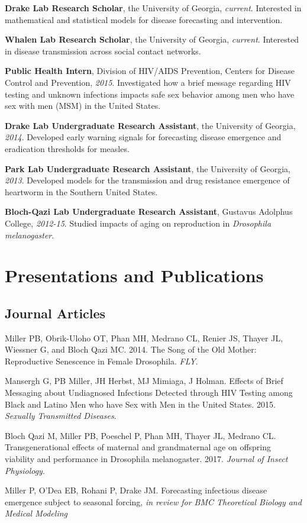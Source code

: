 \documentclass[letterpaper]{article}
\renewenvironment{itemize}{
  \begin{list}{}{
    \setlength{\leftmargin}{1.5em}
  }
}{
  \end{list}
}
\begin{document}
\begin{itemize}
\item \textbf{Drake Lab Research Scholar}, the University of Georgia, \textit{current}. Interested in mathematical and statistical models for disease forecasting and intervention. 
\item \textbf{Whalen Lab Research Scholar}, the University of Georgia, \textit{current}. Interested in disease transmission across social contact networks. 

\item \textbf{Public Health Intern}, Division of HIV/AIDS Prevention, Centers for Disease Control and Prevention, \textit{2015}. Investigated how a brief message regarding HIV testing and unknown infections impacts safe sex behavior among men who have sex with men (MSM) in the United States.
\item \textbf{Drake Lab Undergraduate Research Assistant}, the University of Georgia, \textit{2014}. Developed early warning signals for forecasting disease emergence and eradication thresholds  for measles.
\item \textbf{Park Lab Undergraduate Research Assistant}, the University of Georgia, \textit{2013}. Developed models for the transmission and drug resistance emergence of heartworm in the Southern United States. 
\item \textbf{Bloch-Qazi Lab Undergraduate Research Assistant}, Gustavus Adolphus College, \textit{2012-15}. Studied impacts of aging on reproduction in \textit{Drosophila melanogaster}. 

\end{itemize}

\section*{Presentations and Publications}

\subsection*{Journal Articles}

\begin{itemize}
\item Miller PB, Obrik-Uloho OT, Phan MH, Medrano CL, Renier JS, Thayer JL, Wiessner G, and Bloch Qazi MC. 2014. The Song of the Old Mother: Reproductive Senescence in Female Drosophila. \textit{FLY}.
\item Mansergh G, PB Miller, JH Herbst, MJ Mimiaga, J Holman. Effects of Brief Messaging about Undiagnosed Infections Detected through HIV Testing among Black and Latino Men who have Sex with Men in the United States. 2015. \textit{Sexually Transmitted Diseases}.
\item Bloch Qazi M, Miller PB, Poeschel P, Phan MH, Thayer JL, Medrano CL. Transgenerational effects of maternal and grandmaternal age on offspring viability and performance in Drosophila melanogaster. 2017. \textit{Journal of Insect Physiology}.
\item Miller P, O'Dea EB, Rohani P, Drake JM. Forecasting infectious disease emergence subject to seasonal forcing, \textit{in review for BMC Theoretical Biology and Medical Modeling}
\end{itemize}
\end{document}
